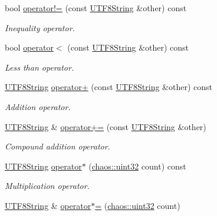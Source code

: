 \begin{DoxyCompactItemize}
bool \hyperlink{classchaos_1_1uni_1_1_u_t_f8_string_ad2a48c9e0d16c41b64efae5b3c02d0a0}{operator!=} (const \hyperlink{classchaos_1_1uni_1_1_u_t_f8_string}{U\-T\-F8\-String} \&other) const 
\begin{DoxyCompactList}\small\item\em Inequality operator. \end{DoxyCompactList}\item 
bool \hyperlink{classchaos_1_1uni_1_1_u_t_f8_string_ad550d07d711ab6567d0ea91a18d403d0}{operator$<$} (const \hyperlink{classchaos_1_1uni_1_1_u_t_f8_string}{U\-T\-F8\-String} \&other) const 
\begin{DoxyCompactList}\small\item\em Less than operator. \end{DoxyCompactList}\item 
\hyperlink{classchaos_1_1uni_1_1_u_t_f8_string}{U\-T\-F8\-String} \hyperlink{classchaos_1_1uni_1_1_u_t_f8_string_a5fe1d0226ef6cb5517a57feb1b7f2170}{operator+} (const \hyperlink{classchaos_1_1uni_1_1_u_t_f8_string}{U\-T\-F8\-String} \&other) const 
\begin{DoxyCompactList}\small\item\em Addition operator. \end{DoxyCompactList}\item 
\hyperlink{classchaos_1_1uni_1_1_u_t_f8_string}{U\-T\-F8\-String} \& \hyperlink{classchaos_1_1uni_1_1_u_t_f8_string_afec3c3e16fabcabbc833e5343fddd4cc}{operator+=} (const \hyperlink{classchaos_1_1uni_1_1_u_t_f8_string}{U\-T\-F8\-String} \&other)
\begin{DoxyCompactList}\small\item\em Compound addition operator. \end{DoxyCompactList}\item 
\hyperlink{classchaos_1_1uni_1_1_u_t_f8_string}{U\-T\-F8\-String} \hyperlink{classchaos_1_1uni_1_1_u_t_f8_string_ae281a6e92025aee3b31442574c3b335e}{operator$\ast$} (\hyperlink{namespacechaos_a8641b3ae4551f0b35570d4f9f4ec22d9}{chaos\-::uint32} count) const 
\begin{DoxyCompactList}\small\item\em Multiplication operator. \end{DoxyCompactList}\item 
\hyperlink{classchaos_1_1uni_1_1_u_t_f8_string}{U\-T\-F8\-String} \& \hyperlink{classchaos_1_1uni_1_1_u_t_f8_string_a32d6e265762d24b6185573d8693a7fc7}{operator$\ast$=} (\hyperlink{namespacechaos_a8641b3ae4551f0b35570d4f9f4ec22d9}{chaos\-::uint32} count)

\end{DoxyCompactItemize}
